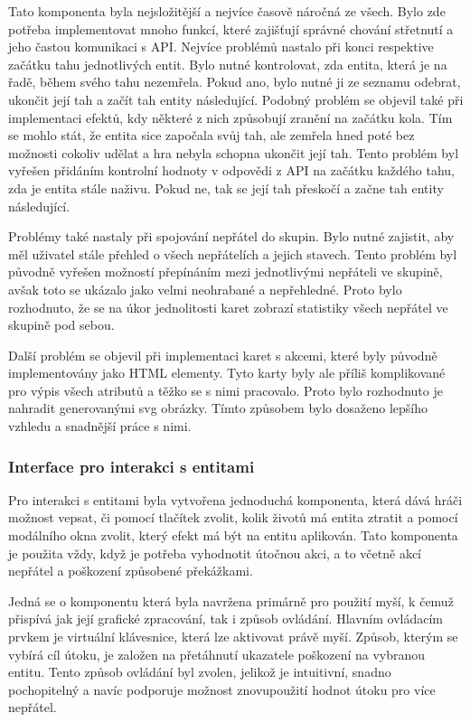 Tato komponenta byla nejsložitější a nejvíce časově náročná ze všech. Bylo zde potřeba implementovat mnoho funkcí, které zajišťují správné chování střetnutí a jeho častou komunikaci s API. Nejvíce problémů nastalo při konci respektive začátku tahu jednotlivých entit. Bylo nutné kontrolovat, zda entita, která je na řadě, během svého tahu nezemřela. Pokud ano, bylo nutné ji ze seznamu odebrat, ukončit její tah a začít tah entity následující. Podobný problém se objevil také při implementaci efektů, kdy některé z nich způsobují zranění na začátku kola. Tím se mohlo stát, že entita sice započala svůj tah, ale zemřela hned poté bez možnosti cokoliv udělat a hra nebyla schopna ukončit její tah. Tento problém byl vyřešen přidáním kontrolní hodnoty v odpovědi z API na začátku každého tahu, zda je entita stále naživu. Pokud ne, tak se její tah přeskočí a začne tah entity následující.

Problémy také nastaly při spojování nepřátel do skupin. Bylo nutné zajistit, aby měl uživatel stále přehled o všech nepřátelích a jejich stavech. Tento problém byl původně vyřešen možností přepínáním mezi jednotlivými nepřáteli ve skupině, avšak toto se ukázalo jako velmi neohrabané a nepřehledné. Proto bylo rozhodnuto, že se na úkor jednolitosti karet zobrazí statistiky všech nepřátel ve skupině pod sebou.

Další problém se objevil při implementaci karet s akcemi, které byly původně implementovány jako HTML elementy. Tyto karty byly ale příliš komplikované pro výpis všech atributů a těžko se s nimi pracovalo. Proto bylo rozhodnuto je nahradit generovanými svg obrázky. Tímto způsobem bylo dosaženo lepšího vzhledu a snadnější práce s nimi.

\subsubsection*{Interface pro interakci s entitami}
Pro interakci s entitami byla vytvořena jednoduchá komponenta, která dává hráči možnost vepsat, či pomocí tlačítek zvolit, kolik životů má entita ztratit a pomocí modálního okna zvolit, který efekt má být na entitu aplikován. Tato komponenta je použita vždy, když je potřeba vyhodnotit útočnou akci, a to včetně akcí nepřátel a poškození způsobené překážkami.

Jedná se o komponentu která byla navržena primárně pro použití myší, k čemuž přispívá jak její grafické zpracování, tak i způsob ovládání. Hlavním ovládacím prvkem je virtuální klávesnice, která lze aktivovat právě myší. Způsob, kterým se vybírá cíl útoku, je založen na přetáhnutí ukazatele poškození na vybranou entitu. Tento způsob ovládání byl zvolen, jelikož je intuitivní, snadno pochopitelný a navíc podporuje možnost znovupoužití hodnot útoku pro více nepřátel.

